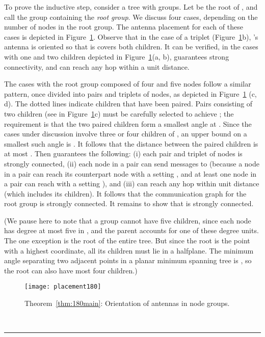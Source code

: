 \documentclass[11pt]{article}
\newcommand{\qed}{\rule{0.5em}{1.5ex}}
\newcommand{\fqed}{{\hfill~\qed}}
\newenvironment{proof}{{\noindent \bf Proof.}}
                      {{\hfill \fqed} \vspace{1em}}
\begin{document}
\begin{proof}
To prove the inductive step, consider a tree  with 
groups. Let  be the root of , and call the group containing
 the \emph{root group}.
We discuss four cases, depending on the number of nodes in the root
group. The antenna placement for each of these cases is depicted in
Figure~\ref{fig:placement180}.
Observe that in the case of a triplet (Figure~\ref{fig:placement180}b),
's antenna is oriented so that is covers both children.
It can be verified, in the cases with one and two children depicted
in Figure~\ref{fig:placement180}(a, b),
 guarantees strong connectivity, and  can reach any
hop within a unit distance.

The cases with the root group composed of four and five nodes
follow a similar pattern, once divided into pairs and triplets of nodes,
as depicted in Figure~\ref{fig:placement180} (c, d).
The dotted lines indicate children that have been paired.
Pairs consisting of two children
(see  in Figure~\ref{fig:placement180}c) must be carefully
selected to achieve ; the
requirement is that the two paired children form a smallest
angle at . Since the cases under discussion involve
three or four children of , an upper bound on a smallest such
angle is . It follows that the distance between the paired
children is at most .
Then  guarantees the following:
(i) each pair and triplet of nodes is strongly connected, (ii)
each node in a pair can send messages to  (because a node in a
pair can reach its counterpart node with
a setting , and at least one node in a pair can
reach  with a setting ), and
(iii)  can reach any hop within unit distance (which includes its children).
It follows that the communication graph for the root group is strongly connected.
It remains to show that  is strongly connected.

(We pause here to note that a group cannot have five children, since each node
has degree at most five in , and the parent accounts for one of these
degree units. The one exception is the root of the entire tree. But since the
root is the point with a highest  coordinate, all its children must lie in
a halfplane. The minimum angle separating two adjacent points in a planar
minimum spanning tree is , so the root can also have most four
children.)

\begin{figure}[htpb]
\centering
\texttt{[image: placement180]}
\caption{Theorem~\ref{thm:180main}: Orientation of antennas in node groups.}
\label{fig:placement180}
\end{figure}


\end{proof}
\end{document}
